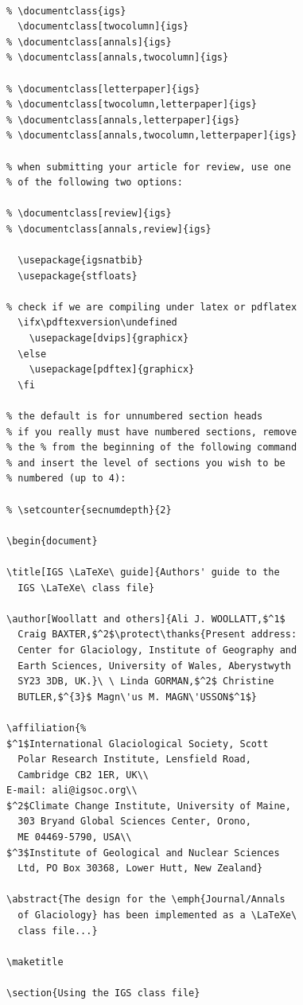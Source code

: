 \documentclass[twocolumn]{igs}
\begin{document}
\begin{verbatim}

% \documentclass{igs}
  \documentclass[twocolumn]{igs}
% \documentclass[annals]{igs}
% \documentclass[annals,twocolumn]{igs}

% \documentclass[letterpaper]{igs}
% \documentclass[twocolumn,letterpaper]{igs}
% \documentclass[annals,letterpaper]{igs}
% \documentclass[annals,twocolumn,letterpaper]{igs}

% when submitting your article for review, use one
% of the following two options:

% \documentclass[review]{igs}
% \documentclass[annals,review]{igs}

  \usepackage{igsnatbib}
  \usepackage{stfloats}

% check if we are compiling under latex or pdflatex
  \ifx\pdftexversion\undefined
    \usepackage[dvips]{graphicx}
  \else
    \usepackage[pdftex]{graphicx}
  \fi

% the default is for unnumbered section heads
% if you really must have numbered sections, remove
% the % from the beginning of the following command
% and insert the level of sections you wish to be
% numbered (up to 4):

% \setcounter{secnumdepth}{2}

\begin{document}

\title[IGS \LaTeXe\ guide]{Authors' guide to the
  IGS \LaTeXe\ class file}

\author[Woollatt and others]{Ali J. WOOLLATT,$^1$
  Craig BAXTER,$^2$\protect\thanks{Present address:
  Center for Glaciology, Institute of Geography and
  Earth Sciences, University of Wales, Aberystwyth
  SY23 3DB, UK.}\ \ Linda GORMAN,$^2$ Christine
  BUTLER,$^{3}$ Magn\'us M. MAGN\'USSON$^1$}

\affiliation{%
$^1$International Glaciological Society, Scott
  Polar Research Institute, Lensfield Road,
  Cambridge CB2 1ER, UK\\
E-mail: ali@igsoc.org\\
$^2$Climate Change Institute, University of Maine,
  303 Bryand Global Sciences Center, Orono,
  ME 04469-5790, USA\\
$^3$Institute of Geological and Nuclear Sciences
  Ltd, PO Box 30368, Lower Hutt, New Zealand}

\abstract{The design for the \emph{Journal/Annals
  of Glaciology} has been implemented as a \LaTeXe\
  class file...}

\maketitle

\section{Using the IGS class file}

\end{verbatim}
\end{document}
